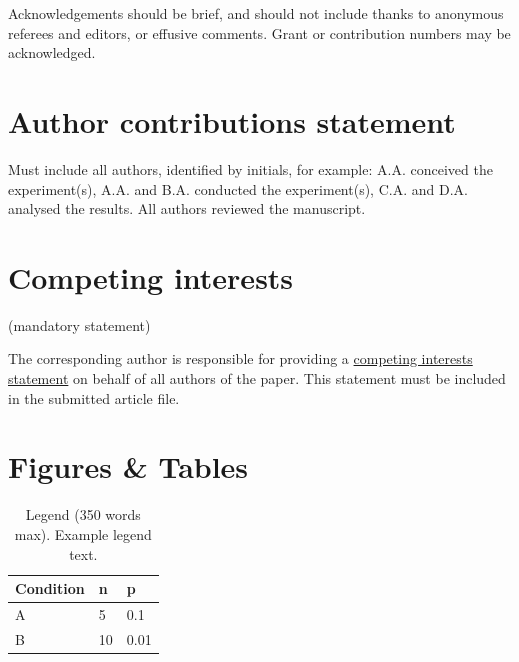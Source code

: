 \documentclass[fleqn,10pt]{wlscirep}
\begin{document}
Acknowledgements should be brief, and should not include thanks to anonymous referees and editors, or effusive comments. Grant or contribution numbers may be acknowledged.

\section*{Author contributions statement}

Must include all authors, identified by initials, for example:
A.A. conceived the experiment(s), A.A. and B.A. conducted the experiment(s), C.A. and D.A. analysed the results. All authors reviewed the manuscript. 

\section*{Competing interests} (mandatory statement)

The corresponding author is responsible for providing a \href{https://www.nature.com/sdata/policies/editorial-and-publishing-policies#competing}{competing interests statement} on behalf of all authors of the paper. This statement must be included in the submitted article file.

\section*{Figures \& Tables}


\begin{table}[ht]
\centering
\begin{tabular}{|l|l|l|}
\hline
Condition & n & p \\
\hline
A & 5 & 0.1 \\
\hline
B & 10 & 0.01 \\
\hline
\end{tabular}
\caption{\label{tab:example}Legend (350 words max). Example legend text.}
\end{table}
\end{document}
